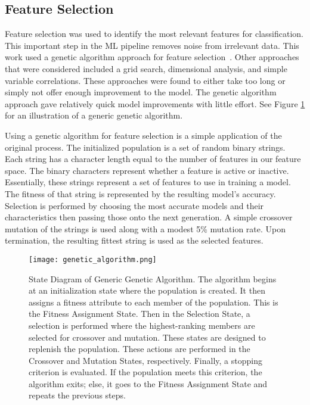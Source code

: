 \subsection{Feature Selection}
Feature selection was used to identify the most relevant features for classification.
This important step in the \ac{ML} pipeline removes noise from irrelevant data.
This work used a genetic algorithm approach for feature selection~\cite{yang1998feature}.
Other approaches that were considered included a grid search, dimensional analysis, and simple variable correlations.
These approaches were found to either take too long or simply not offer enough improvement to the model.
The genetic algorithm approach gave relatively quick model improvements with little effort.
See Figure \ref{fig:genetic} for an illustration of a generic genetic algorithm.

\par
Using a genetic algorithm for feature selection is a simple application of the original process.
The initialized population is a set of random binary strings.
Each string has a character length equal to the number of features in our feature space.
The binary characters represent whether a feature is active or inactive.
Essentially, these strings represent a set of features to use in training a model.
The fitness of that string is represented by the resulting model's accuracy.
Selection is performed by choosing the most accurate models and their characteristics then passing those onto the next generation.
A simple crossover mutation of the strings is used along with a modest 5\% mutation rate.
Upon termination, the resulting fittest string is used as the selected features.


\begin{figure}[htp]
    \centering
    \texttt{[image: genetic\_algorithm.png]}
    \caption[Figure depicting a genetic algorithm]{State Diagram of Generic Genetic Algorithm.
    The algorithm begins at an initialization state where the population is created.
    It then assigns a fitness attribute to each member of the population.
    This is the Fitness Assignment State.
    Then in the Selection State, a selection is performed where the highest-ranking members are selected for crossover and mutation.
    These states are designed to replenish the population.
    These actions are performed in the Crossover and Mutation States, respectively.
    Finally, a stopping criterion is evaluated.
    If the population meets this criterion, the algorithm exits; else, it goes to the Fitness Assignment State and repeats the previous steps.}
    \label{fig:genetic}
\end{figure}


